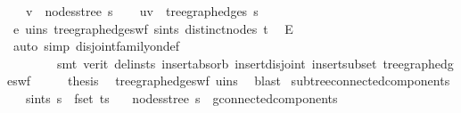 \begin{isabellebody}
\ \ \ {\isachardoublequoteopen}v\ {\isasymin}\ nodes{\isacharunderscore}{\kern0pt}stree\ s{\isachardoublequoteclose}\isanewline
%
\isadelimproof
%
\endisadelimproof
%
\isatagproof
{}\isamarkupfalse%
{\isacharminus}{\kern0pt}\isanewline
\ \ \isamarkupfalse%
\ {\isachardoublequoteopen}{\isacharbraceleft}{\kern0pt}u{\isacharcomma}{\kern0pt}v{\isacharbraceright}{\kern0pt}\ {\isasymin}\ tree{\isacharunderscore}{\kern0pt}graph{\isacharunderscore}{\kern0pt}edges\ s{\isachardoublequoteclose}\ \isamarkupfalse%
\ e\ u{\isacharunderscore}{\kern0pt}in{\isacharunderscore}{\kern0pt}s\ tree{\isacharunderscore}{\kern0pt}graph{\isacharunderscore}{\kern0pt}edges{\isacharunderscore}{\kern0pt}wf\ s{\isacharunderscore}{\kern0pt}in{\isacharunderscore}{\kern0pt}ts\ distinct{\isacharunderscore}{\kern0pt}nodes\ t\ \isamarkupfalse%
\ E{\isacharprime}{\kern0pt}\isanewline
\ \ \ \ \isamarkupfalse%
\ {\isacharparenleft}{\kern0pt}auto\ simp{\isacharcolon}{\kern0pt}\ disjoint{\isacharunderscore}{\kern0pt}family{\isacharunderscore}{\kern0pt}on{\isacharunderscore}{\kern0pt}def{\isacharcomma}{\kern0pt}\isanewline
\ \ \ \ \ \ \ \ smt\ {\isacharparenleft}{\kern0pt}verit{\isacharcomma}{\kern0pt}\ del{\isacharunderscore}{\kern0pt}insts{\isacharparenright}{\kern0pt}\ insert{\isacharunderscore}{\kern0pt}absorb\ insert{\isacharunderscore}{\kern0pt}disjoint{\isacharparenleft}{\kern0pt}{}{\isacharparenright}{\kern0pt}\ insert{\isacharunderscore}{\kern0pt}subset\ tree{\isacharunderscore}{\kern0pt}graph{\isacharunderscore}{\kern0pt}edges{\isacharunderscore}{\kern0pt}wf{\isacharparenright}{\kern0pt}\isanewline
\ \ \isamarkupfalse%
\ \isamarkupfalse%
\ {\isacharquery}{\kern0pt}thesis\ \isamarkupfalse%
\ tree{\isacharunderscore}{\kern0pt}graph{\isacharunderscore}{\kern0pt}edges{\isacharunderscore}{\kern0pt}wf\ u{\isacharunderscore}{\kern0pt}in{\isacharunderscore}{\kern0pt}s\ \isamarkupfalse%
\ blast\isanewline
{}\isamarkupfalse%
%
\endisatagproof
{\isafoldproof}%
%
\isadelimproof
\isanewline
%
\endisadelimproof
\isanewline
{}\isamarkupfalse%
\ subtree{\isacharunderscore}{\kern0pt}connected{\isacharunderscore}{\kern0pt}components{\isacharcolon}{\kern0pt}\isanewline
\ \ \ s{\isacharunderscore}{\kern0pt}in{\isacharunderscore}{\kern0pt}ts{\isacharcolon}{\kern0pt}\ {\isachardoublequoteopen}s\ {\isasymin}\ fset\ ts{\isachardoublequoteclose}\isanewline
\ \ \ {\isachardoublequoteopen}nodes{\isacharunderscore}{\kern0pt}stree\ s\ {\isasymin}\ g{\isacharprime}{\kern0pt}{\isachardot}{\kern0pt}connected{\isacharunderscore}{\kern0pt}components{\isachardoublequoteclose}\isanewline

\end{isabellebody}
